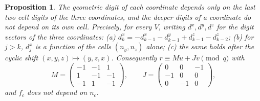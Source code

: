 \documentclass[11pt]{amsart}
\newtheorem{proposition}[theorem]{Proposition}
\theoremstyle{definition}
\theoremstyle{plain}
\begin{document}
\begin{proposition}\label{prop:cell}
The geometric digit of each coordinate depends only on the last two cell digits of the three coordinates, and the deeper digits of a coordinate do not depend on its own cell. Precisely, for every $V$, writing $d^x,d^y,d^z$ for the digit vectors of the three coordinates:
(a) $d^x_k=-d^x_{k-1}-d^y_{k-1}+d^z_{k-1}-d^z_{k-2}$;
(b) for $j>k$, $d^x_j$ is a function of the cells $(n_y,n_z)$ alone;
(c) the same holds after the cyclic shift $(x,y,z)\mapsto(y,z,x)$.
Consequently $r\equiv Mu+Jv\pmod q$ with
\[
M=\begin{pmatrix}-1&-1&1\\1&-1&-1\\-1&1&-1\end{pmatrix},\qquad J=\begin{pmatrix}0&0&-1\\-1&0&0\\0&-1&0\end{pmatrix},
\]
and $f_c$ does not depend on $n_c$.
\end{proposition}
\end{document}

